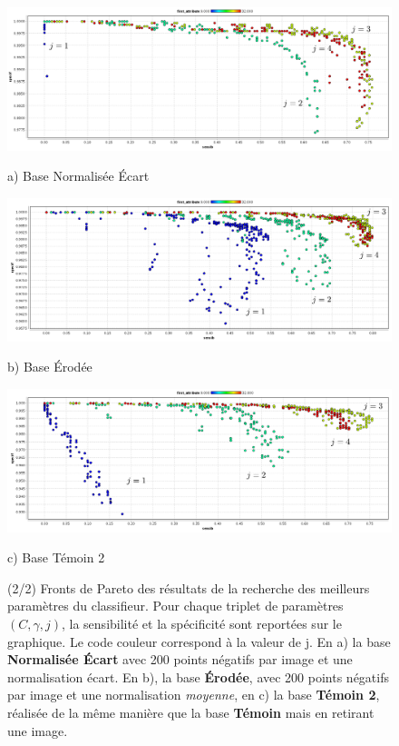 \begin{figure}[h!]
\begin{center}


\includegraphics[width=14cm]{images/pareto_param_range}

{\small a) Base Normalisée \'Ecart}

\vspace{0.5cm}

\includegraphics[width=14cm]{images/pareto_param_erosion}

{\small b) Base Érodée}

 \includegraphics[width=14cm]{images/pareto_param_200_2}

{\small c) Base Témoin 2}

\end{center}
 \caption[(2/2) Recherche des meilleurs paramètres du classifieurs : Fronts de pareto ]{(2/2) Fronts de Pareto des résultats de la recherche des meilleurs paramètres du classifieur. Pour chaque triplet de paramètres $(C, \gamma, j)$, la sensibilité et la spécificité sont reportées sur le graphique. Le code couleur correspond à la valeur de j. En a) la base \textbf{Normalisée Écart} avec 200 points négatifs par image et une normalisation écart. En b), la base \textbf{Érodée}, avec 200 points négatifs par image et une normalisation \emph{moyenne}, en c) la base \textbf{Témoin 2}, réalisée de la même manière que la base \textbf{Témoin} mais en retirant une image. }
\label{fig:paretoParams2}
\end{figure}


